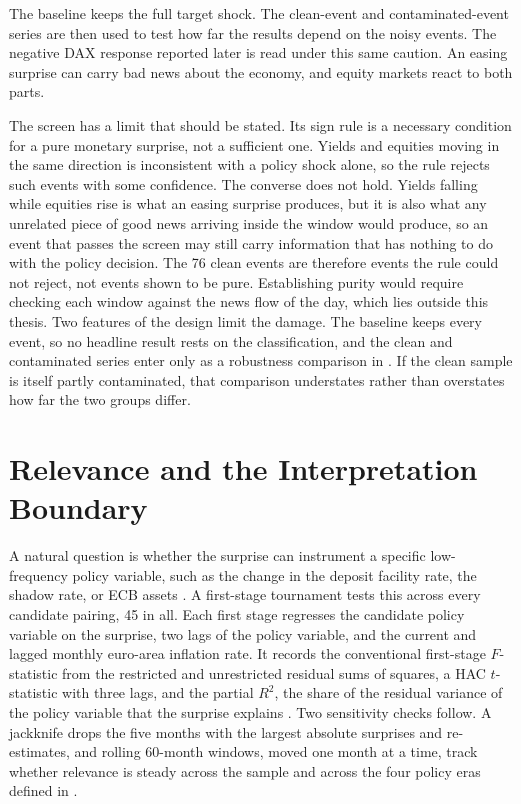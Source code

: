 The baseline keeps the full target shock. The clean-event and contaminated-event series are then used to test how far the results depend on the noisy events. The negative DAX response reported later is read under this same caution. An easing surprise can carry bad news about the economy, and equity markets react to both parts.

The screen has a limit that should be stated. Its sign rule is a necessary condition for a pure monetary surprise, not a sufficient one. Yields and equities moving in the same direction is inconsistent with a policy shock alone, so the rule rejects such events with some confidence. The converse does not hold. Yields falling while equities rise is what an easing surprise produces, but it is also what any unrelated piece of good news arriving inside the window would produce, so an event that passes the screen may still carry information that has nothing to do with the policy decision. The 76 clean events are therefore events the rule could not reject, not events shown to be pure. Establishing purity would require checking each window against the news flow of the day, which lies outside this thesis. Two features of the design limit the damage. The baseline keeps every event, so no headline result rests on the classification, and the clean and contaminated series enter only as a robustness comparison in . If the clean sample is itself partly contaminated, that comparison understates rather than overstates how far the two groups differ.

\section{Relevance and the Interpretation Boundary}

A natural question is whether the surprise can instrument a specific low-frequency policy variable, such as the change in the deposit facility rate, the shadow rate, or ECB assets \parencite{MertensRavn2013,StockWatson2018}. A first-stage tournament tests this across every candidate pairing, 45 in all. Each first stage regresses the candidate policy variable on the surprise, two lags of the policy variable, and the current and lagged monthly euro-area inflation rate. It records the conventional first-stage \(F\)-statistic from the restricted and unrestricted residual sums of squares, a HAC \(t\)-statistic with three lags, and the partial \(R^2\), the share of the residual variance of the policy variable that the surprise explains \parencite{StockYogo2005}. Two sensitivity checks follow. A jackknife drops the five months with the largest absolute surprises and re-estimates, and rolling 60-month windows, moved one month at a time, track whether relevance is steady across the sample and across the four policy eras defined in .

